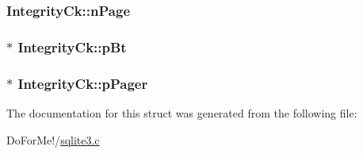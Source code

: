 \hypertarget{struct_integrity_ck_a04f496ef7239aea6dccb6a861bb5a798}{
\subsubsection[{n\-Page}]{ Integrity\-Ck\-::n\-Page}}\label{struct_integrity_ck_a04f496ef7239aea6dccb6a861bb5a798}
\hypertarget{struct_integrity_ck_a65f03f54514f504bd871bb2ccd3da188}{
\subsubsection[{p\-Bt}]{$\ast$ Integrity\-Ck\-::p\-Bt}}\label{struct_integrity_ck_a65f03f54514f504bd871bb2ccd3da188}
\hypertarget{struct_integrity_ck_a87e7f8b012b61b61fae359269cbacce4}{
\subsubsection[{p\-Pager}]{$\ast$ Integrity\-Ck\-::p\-Pager}}\label{struct_integrity_ck_a87e7f8b012b61b61fae359269cbacce4}


The documentation for this struct was generated from the following file\-:\begin{DoxyCompactItemize}
\item 
Do\-For\-Me!/\hyperlink{sqlite3_8c}{sqlite3.\-c}\end{DoxyCompactItemize}
